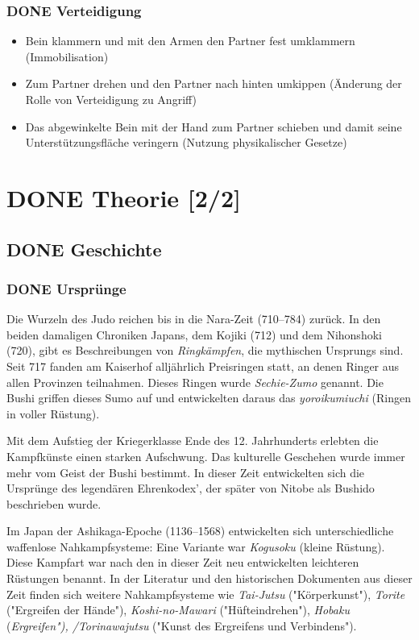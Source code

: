 \documentclass[11pt]{article}
\begin{document}
\subsubsection{{\bfseries\sffamily DONE} Verteidigung}
\label{sec:org2377bfd}
\begin{itemize}
\item Bein klammern und mit den Armen den Partner fest umklammern (Immobilisation)
\item Zum Partner drehen und den Partner nach hinten umkippen (Änderung der Rolle von Verteidigung zu Angriff)
\item Das abgewinkelte Bein mit der Hand zum Partner schieben und damit seine Unterstützungsfläche veringern (Nutzung physikalischer Gesetze)
\end{itemize}

\section{{\bfseries\sffamily DONE} Theorie [2/2]}
\label{sec:org152f95c}
\subsection{{\bfseries\sffamily DONE} Geschichte}
\label{sec:org38929dc}
\subsubsection{{\bfseries\sffamily DONE} Ursprünge}
\label{sec:org4acb4e6}
Die Wurzeln des \label{org5f8b831}Judo reichen bis in die Nara-Zeit (710–784) zurück. In den beiden damaligen Chroniken Japans, dem Kojiki (712) und dem Nihonshoki (720), gibt es Beschreibungen von \emph{Ringkämpfen}, die mythischen Ursprungs sind. Seit 717 fanden am Kaiserhof alljährlich Preisringen statt, an denen Ringer aus allen Provinzen teilnahmen. Dieses Ringen wurde \emph{Sechie-Zumo} genannt. Die Bushi griffen dieses Sumo auf und entwickelten daraus das \emph{yoroikumiuchi} (Ringen in voller Rüstung).

Mit dem Aufstieg der Kriegerklasse Ende des 12. Jahrhunderts erlebten die Kampfkünste einen starken Aufschwung. Das kulturelle Geschehen wurde immer mehr vom Geist der Bushi bestimmt. In dieser Zeit entwickelten sich die Ursprünge des legendären Ehrenkodex', der später von Nitobe als Bushido beschrieben wurde.

Im Japan der Ashikaga-Epoche (1136–1568) entwickelten sich unterschiedliche waffenlose Nahkampfsysteme: Eine Variante war \emph{Kogusoku} (kleine Rüstung). Diese Kampfart war nach den in dieser Zeit neu entwickelten leichteren Rüstungen benannt. In der Literatur und den historischen Dokumenten aus dieser Zeit finden sich weitere Nahkampfsysteme wie \emph{Tai-Jutsu} ("Körperkunst"), \emph{Torite} ("Ergreifen der Hände"), \emph{Koshi-no-Mawari} ("Hüfteindrehen"), \emph{Hobaku} (\emph{Ergreifen"), /Torinawajutsu} ("Kunst des Ergreifens und Verbindens").
\end{document}
